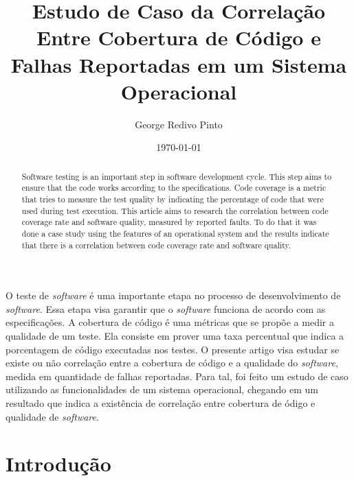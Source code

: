 \documentclass[11.5pt]{article}
\date{\today}
\title{
    Estudo de Caso da Correlação Entre Cobertura de Código e Falhas Reportadas em um Sistema
    Operacional
}
\author{George Redivo Pinto}
\begin{document}
\imprimircapa
\imprimirfolhaderosto

\maketitle

\begin{abstract}

Software testing is an important step in software development cycle. This step aims to ensure that
the code works according to the specifications.
Code coverage is a metric that tries to measure the test quality by indicating the percentage of
code that were used during test execution.
This article aims to research the correlation between code coverage rate and software quality,
measured by reported faults.
To do that it was done a case study using the features of an operational system and the results
indicate that there is a correlation between code coverage rate and software quality.

\end{abstract}

\begin{resumo}

O teste de \textit{software} é uma importante etapa no processo de desenvolvimento de
\textit{software}.
Essa etapa visa garantir que o \textit{software} funciona de acordo com as especificações.
A cobertura de código é uma métricas que se propõe a medir a qualidade de um teste. Ela consiste em
prover uma taxa percentual que indica a porcentagem de código executadas nos testes.
O presente artigo visa estudar se existe ou não correlação entre a cobertura de código e a
qualidade do \textit{software}, medida em quantidade de falhas reportadas.
Para tal, foi feito um estudo de caso utilizando as funcionalidades de um sistema operacional,
chegando em um resultado que indica a existência de correlação entre cobertura de ódigo e
qualidade de \textit{software}.


\end{resumo}




\section{Introdução}
\end{document}
